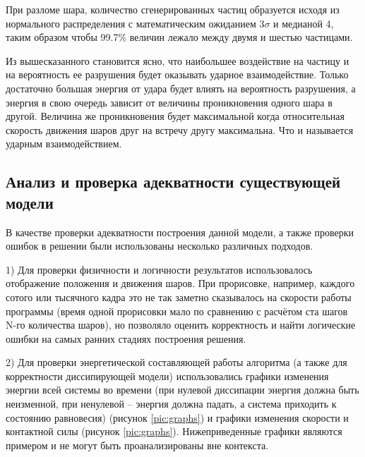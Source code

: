 \documentclass[utf8x, 14pt, oneside, a4paper]{article}
\begin{document}
При разломе шара, количество сгенерированных частиц образуется исходя из нормального распределения с математическим ожиданием $3\sigma$ и медианой 4, таким образом чтобы 99.7\% величин лежало между двумя и шестью частицами.

Из вышесказанного становится ясно, что наибольшее воздействие на частицу и на вероятность ее разрушения будет оказывать ударное взаимодействие.
Только достаточно большая энергия от удара будет влиять на вероятность разрушения, а энергия в свою очередь зависит от величины проникновения одного шара в другой.
Величина же проникновения будет максимальной когда относительная скорость движения шаров друг на встречу другу максимальна. Что и называется ударным взаимодействием.



\subsection{Анализ и проверка адекватности существующей модели}

В качестве проверки адекватности построения данной модели, а также проверки ошибок в решении были использованы несколько различных подходов.

1) Для проверки физичности и логичности результатов использовалось отображение положения и движения шаров.
При прорисовке, например, каждого сотого или тысячного кадра это не так заметно сказывалось на скорости работы программы (время одной прорисовки мало по сравнению с расчётом ста шагов N-го количества шаров), но позволяло оценить корректность и найти логические ошибки на самых ранних стадиях построения решения.

2) Для проверки энергетической составляющей работы алгоритма (а также для корректности диссипирующей модели) использовались графики изменения энергии всей системы во времени (при нулевой диссипации энергия должна быть неизменной, при ненулевой -- энергия должна падать, а система приходить к состоянию равновесия) (рисунок \ref{pic:graphs}) и графики изменения скорости и контактной силы (рисунок \ref{pic:graphs}). Нижеприведенные графики являются примером и не могут быть проанализированы вне контекста.
\end{document}

